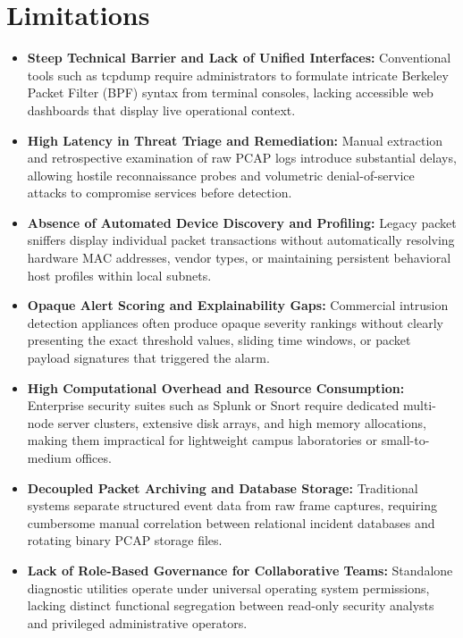 \documentclass[a4paper,12pt]{report}
\begin{document}
	\section{Limitations}
	\begin{itemize}
		\item \textbf{Steep Technical Barrier and Lack of Unified Interfaces:}
		Conventional tools such as tcpdump require administrators to formulate intricate Berkeley Packet Filter (BPF) syntax from terminal consoles, lacking accessible web dashboards that display live operational context.
		
		\item \textbf{High Latency in Threat Triage and Remediation:}
		Manual extraction and retrospective examination of raw PCAP logs introduce substantial delays, allowing hostile reconnaissance probes and volumetric denial-of-service attacks to compromise services before detection.
		
		\item \textbf{Absence of Automated Device Discovery and Profiling:}
		Legacy packet sniffers display individual packet transactions without automatically resolving hardware MAC addresses, vendor types, or maintaining persistent behavioral host profiles within local subnets.
		
		\item \textbf{Opaque Alert Scoring and Explainability Gaps:}
		Commercial intrusion detection appliances often produce opaque severity rankings without clearly presenting the exact threshold values, sliding time windows, or packet payload signatures that triggered the alarm.
		
		\item \textbf{High Computational Overhead and Resource Consumption:}
		Enterprise security suites such as Splunk or Snort require dedicated multi-node server clusters, extensive disk arrays, and high memory allocations, making them impractical for lightweight campus laboratories or small-to-medium offices.
		
		\item \textbf{Decoupled Packet Archiving and Database Storage:}
		Traditional systems separate structured event data from raw frame captures, requiring cumbersome manual correlation between relational incident databases and rotating binary PCAP storage files.
		
		\item \textbf{Lack of Role-Based Governance for Collaborative Teams:}
		Standalone diagnostic utilities operate under universal operating system permissions, lacking distinct functional segregation between read-only security analysts and privileged administrative operators.
		

\end{itemize}
\end{document}
